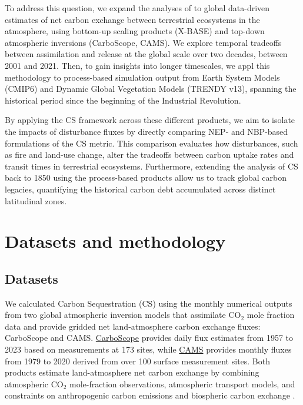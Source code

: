 \documentclass[ProofPDF]{./Styles/Jnls-Template-V3}
\begin{document}
To address this question, we expand the analyses of \cite{Metzler2024} to global data-driven estimates of net carbon exchange between terrestrial ecosystems in the atmosphere, using bottom-up scaling products (X-BASE) and top-down atmospheric inversions (CarboScope, CAMS). We explore temporal tradeoffs between assimilation and release at the global scale over two decades, between 2001 and 2021. Then, to gain insights into longer timescales, we appl this methodology to process-based simulation output from Earth System Models (CMIP6) and Dynamic Global Vegetation Models (TRENDY v13), spanning the historical period since the beginning of the Industrial Revolution. 

By applying the CS framework across these different products, we aim to isolate the impacts of disturbance fluxes by directly comparing NEP- and NBP-based formulations of the CS metric. This comparison evaluates how disturbances, such as fire and land-use change, alter the tradeoffs between carbon uptake rates and transit times in terrestrial ecosystems. Furthermore, extending the analysis of CS back to 1850 using the process-based products allow us to track global carbon legacies, quantifying the historical carbon debt accumulated across distinct latitudinal zones.

\section{Datasets and methodology}\label{sec:methods}


\subsection{Datasets} 

We calculated Carbon Sequestration (CS) using the monthly numerical outputs from two global atmospheric inversion models that assimilate CO$_2$ mole fraction data and provide gridded net land-atmosphere carbon exchange fluxes: CarboScope and CAMS. \hyperlink{https://www.bgc-jena.mpg.de/CarboScope/}{CarboScope} \citep[version nbetEXToc\_v2024E; ][]{Rodenbeck2005} provides daily flux estimates from 1957 to 2023 based on measurements at 173 sites, while \hyperlink{https://ads.atmosphere.copernicus.eu/datasets/cams-global-greenhouse-gas-inversion?tab=overview}{CAMS} \citep[v24;][]{Chevallier2013} provides monthly fluxes from 1979 to 2020 derived from over 100 surface measurement sites. Both products estimate land-atmosphere net carbon exchange by combining atmospheric CO$_2$ mole-fraction observations, atmospheric transport models, and constraints on anthropogenic carbon emissions and biospheric carbon exchange \citep{Kondo2022}. 
\end{document}
